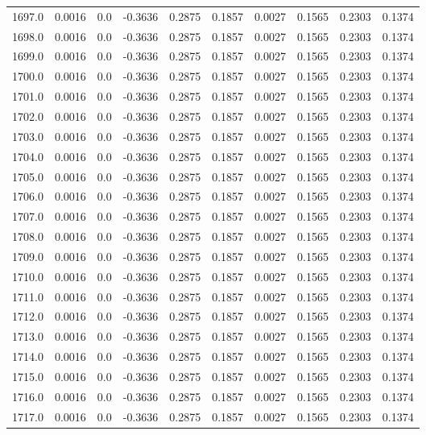 \begin{longtable}{lrrrrrrrrr}
1697.0 & 0.0016 & 0.0 & -0.3636 & 0.2875 & 0.1857 & 0.0027 & 0.1565 & 0.2303 & 0.1374 \\
1698.0 & 0.0016 & 0.0 & -0.3636 & 0.2875 & 0.1857 & 0.0027 & 0.1565 & 0.2303 & 0.1374 \\
1699.0 & 0.0016 & 0.0 & -0.3636 & 0.2875 & 0.1857 & 0.0027 & 0.1565 & 0.2303 & 0.1374 \\
1700.0 & 0.0016 & 0.0 & -0.3636 & 0.2875 & 0.1857 & 0.0027 & 0.1565 & 0.2303 & 0.1374 \\
1701.0 & 0.0016 & 0.0 & -0.3636 & 0.2875 & 0.1857 & 0.0027 & 0.1565 & 0.2303 & 0.1374 \\
1702.0 & 0.0016 & 0.0 & -0.3636 & 0.2875 & 0.1857 & 0.0027 & 0.1565 & 0.2303 & 0.1374 \\
1703.0 & 0.0016 & 0.0 & -0.3636 & 0.2875 & 0.1857 & 0.0027 & 0.1565 & 0.2303 & 0.1374 \\
1704.0 & 0.0016 & 0.0 & -0.3636 & 0.2875 & 0.1857 & 0.0027 & 0.1565 & 0.2303 & 0.1374 \\
1705.0 & 0.0016 & 0.0 & -0.3636 & 0.2875 & 0.1857 & 0.0027 & 0.1565 & 0.2303 & 0.1374 \\
1706.0 & 0.0016 & 0.0 & -0.3636 & 0.2875 & 0.1857 & 0.0027 & 0.1565 & 0.2303 & 0.1374 \\
1707.0 & 0.0016 & 0.0 & -0.3636 & 0.2875 & 0.1857 & 0.0027 & 0.1565 & 0.2303 & 0.1374 \\
1708.0 & 0.0016 & 0.0 & -0.3636 & 0.2875 & 0.1857 & 0.0027 & 0.1565 & 0.2303 & 0.1374 \\
1709.0 & 0.0016 & 0.0 & -0.3636 & 0.2875 & 0.1857 & 0.0027 & 0.1565 & 0.2303 & 0.1374 \\
1710.0 & 0.0016 & 0.0 & -0.3636 & 0.2875 & 0.1857 & 0.0027 & 0.1565 & 0.2303 & 0.1374 \\
1711.0 & 0.0016 & 0.0 & -0.3636 & 0.2875 & 0.1857 & 0.0027 & 0.1565 & 0.2303 & 0.1374 \\
1712.0 & 0.0016 & 0.0 & -0.3636 & 0.2875 & 0.1857 & 0.0027 & 0.1565 & 0.2303 & 0.1374 \\
1713.0 & 0.0016 & 0.0 & -0.3636 & 0.2875 & 0.1857 & 0.0027 & 0.1565 & 0.2303 & 0.1374 \\
1714.0 & 0.0016 & 0.0 & -0.3636 & 0.2875 & 0.1857 & 0.0027 & 0.1565 & 0.2303 & 0.1374 \\
1715.0 & 0.0016 & 0.0 & -0.3636 & 0.2875 & 0.1857 & 0.0027 & 0.1565 & 0.2303 & 0.1374 \\
1716.0 & 0.0016 & 0.0 & -0.3636 & 0.2875 & 0.1857 & 0.0027 & 0.1565 & 0.2303 & 0.1374 \\
1717.0 & 0.0016 & 0.0 & -0.3636 & 0.2875 & 0.1857 & 0.0027 & 0.1565 & 0.2303 & 0.1374 \\

\end{longtable}
